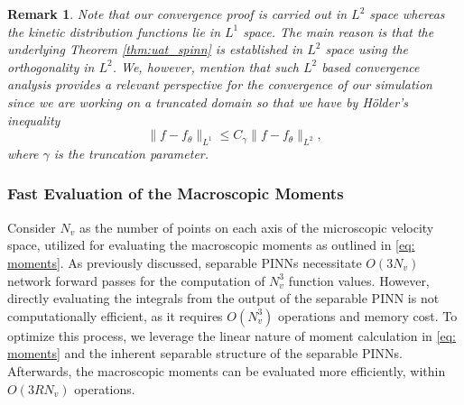\documentclass[preprint,12pt]{elsarticle}
\newtheorem*{remark}{Remark}
\begin{document}
\begin{remark}
Note that our convergence proof is carried out in $L^2$ space whereas the kinetic distribution functions lie in $L^1$ space. The main reason is that the underlying Theorem \ref{thm:uat_spinn} is established in $L^2$ space using the orthogonality in $L^2$. 
We, however, mention that such $L^2$ based convergence analysis provides a relevant perspective for the convergence of our simulation since we are working on a truncated domain so that we have by H{\"o}lder's inequality
\[
    \|f-f_{\theta}\|_{L^1} \leq C_\gamma \|f-f_\theta\|_{L^2},
\]
where $\gamma$ is the truncation parameter.
\end{remark}


\subsubsection{Fast Evaluation of the Macroscopic Moments}
Consider $N_v$ as the number of points on each axis of the microscopic velocity space, utilized for evaluating the macroscopic moments as outlined in \eqref{eq: moments}.
As previously discussed, separable PINNs necessitate $O(3N_v)$ network forward passes for the computation of $N_v^3$ function values. 
However, directly evaluating the integrals from the output of the separable PINN is not computationally efficient, as it requires $O(N_v^3)$ operations and memory cost.
To optimize this process, we leverage the linear nature of moment calculation in \eqref{eq: moments} and the inherent separable structure of the separable PINNs. 
Afterwards, the macroscopic moments can be evaluated more efficiently, within $O(3 R N_v)$ operations.
\end{document}
